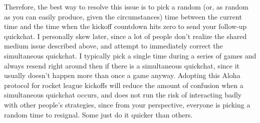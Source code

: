 \documentclass{article}
\begin{document}
Therefore, the best way to resolve this issue is to pick a random (or, as random as you can easily produce, given the circumstances) time between the current time and the time when the kickoff countdown hits zero to send your follow-up quickchat. I personally skew later, since a lot of people don't realize the shared medium issue described above, and attempt to immediately correct the simultaneous quickchat. I typically pick a single time during a series of games and always resend right around then if there is a simultaneous quickchat, since it usually doesn't happen more than once a game anyway. Adopting this Aloha protocol for rocket league kickoffs will reduce the amount of confusion when a simultaneous quickchat occurs, and does not run the risk of interacting badly with other people's strategies, since from your perspective, everyone is picking a random time to resignal. Some just do it quicker than others.\\
\end{document}
